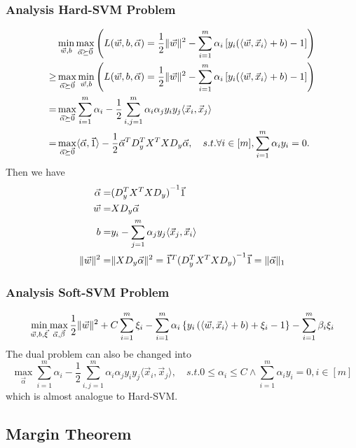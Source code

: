 \subsubsection{Analysis Hard-SVM Problem}%
\label{ssub:analysis_svm_problem}

\begin{align*}
    &\min_{\vec{w}, b} \max_{\vec{\alpha} \succeq \vec{0}} \left(L(\vec{w}, b, \vec{\alpha}) = \frac{1}{2} \Arrowvert \vec{w} \Arrowvert^2 - \sum^{m}_{i=1} \alpha_i \left[ y_i( \langle \vec{w}, \vec{x}_i \rangle + b) - 1 \right] \right)\\
    \ge& \max_{\vec{\alpha} \succeq \vec{0}} \min_{\vec{w}, b} \left(L(\vec{w}, b, \vec{\alpha}) = \frac{1}{2} \Arrowvert \vec{w} \Arrowvert^2 - \sum^{m}_{i=1} \alpha_i \left[ y_i( \langle \vec{w}, \vec{x}_i \rangle + b) - 1 \right] \right)\\
    =& \max_{\vec{\alpha} \succeq \vec{0}} \sum^{m}_{i=1} \alpha_i - \frac{1}{2} \sum^{m}_{i,j = 1} \alpha_i \alpha_j y_i y_j \langle \vec{x}_i, \vec{x}_j \rangle \\
    =& \max_{\vec{\alpha} \succeq \vec{0}} \langle  \vec{\alpha}, \vec{1} \rangle - \frac{1}{2} \vec{\alpha}^T D^T_y X^T X D_y \vec{\alpha},
    \quad s.t.\forall i \in [m], \sum^{m}_{i=1} \alpha_i y_i = 0.\\
\end{align*}
Then we have
\begin{align*}
    \vec{\alpha} =& {(D_y^T X^T X D_y)}^{-1} \vec{1}\\
    \vec{w} =& X D_y \vec{\alpha}\\
    b =& y_i - \sum^{m}_{j = 1} \alpha_j y_j \langle \vec{x}_j, \vec{x}_i \rangle\\
    \Arrowvert \vec{w} \Arrowvert^2 =& \Arrowvert XD_y \vec{\alpha} \Arrowvert^2
    = \vec{1}^T {{(D_y^T X^T X D_y)}^{-1}} \vec{1} = \Arrowvert \vec{\alpha} \Arrowvert_1
\end{align*}

\subsubsection{Analysis Soft-SVM Problem}%
\label{ssub:analysis_soft_svm_problem}

\[
    \min_{\vec{w}, b, \vec{\xi}} \max_{\vec{\alpha}, \vec{\beta}}
    \frac{1}{2} \Arrowvert \vec{w} \Arrowvert^2 + C \sum^{m}_{i=1} \xi_i - \sum^{m}_{i=1} \alpha_i \left\{ y_i \left( \langle \vec{w}, \vec{x}_i \rangle + b \right)+\xi_i - 1 \right\} - \sum^{m}_{i=1} \beta_i \xi_i
\]
The dual problem can also be changed into
\[
    \max_{\vec{\alpha}} \sum^{m}_{i=1} \alpha_i - \frac{1}{2} \sum^{m}_{i,j=1} \alpha_i \alpha_j y_i y_j \langle \vec{x}_i, \vec{x}_j \rangle,
    \quad s.t. 0\le \alpha_i \le C \wedge \sum^{m}_{i=1} \alpha_i y_i = 0, i \in [m]
\]
which is almost analogue to Hard-SVM.\@

\subsection{Margin Theorem}%
\label{sub:margin_theorem}


